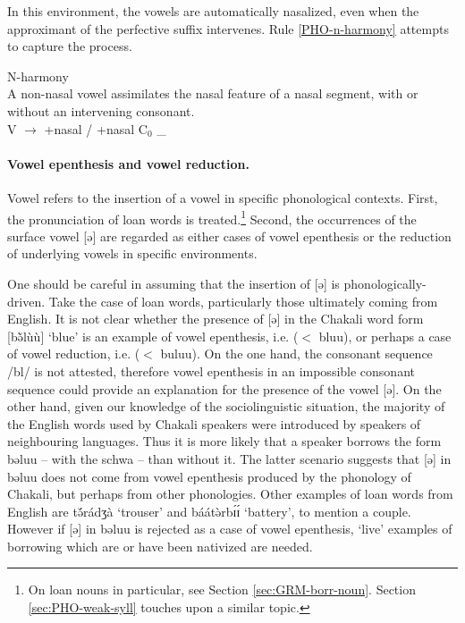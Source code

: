 In this environment, the vowels are  automatically nasalized, even when the
approximant of the perfective suffix intervenes. Rule \ref{PHO-n-harmony}
attempts to capture the process.

\begin{Rule}\label{PHO-n-harmony}{N-harmony}\\
A non-nasal vowel assimilates the nasal feature of a nasal segment, with or
without an intervening consonant. \\
 V $\rightarrow$  {\ob}{\sc +nasal}{\cb} /  {\ob}{\sc +nasal}{\cb} C$_0$  \_  
\end{Rule}




\paragraph{Vowel epenthesis and vowel reduction.}
\label{sec:epenthesis}


Vowel  refers to the insertion of a vowel in specific phonological contexts. First,  the pronunciation of loan words is treated.\footnote{On  loan nouns in particular, see Section \ref{sec:GRM-borr-noun}. Section \ref{sec:PHO-weak-syll} touches upon a similar topic.}  Second,  the occurrences of the surface vowel [{ə}] are regarded as  either cases of vowel epenthesis or the reduction of  underlying vowels in specific environments. 

One should be careful in assuming that the insertion of  [{ə}] is phonologically-driven.  Take the case of loan words, particularly those ultimately coming  from  English. It is not clear whether the presence of [{ə}] in the Chakali word form [{bə̆̀lùù}] `blue'  is an example of vowel epenthesis, i.e.  ($<$ {\sls bluu}),  or perhaps a case of vowel reduction, i.e.  ($<$ {\sls buluu}).  On the one hand, the  consonant sequence  /bl/ is not attested, therefore  vowel epenthesis in an impossible consonant sequence  could  provide an explanation for the presence of  the vowel [{ə}].  On the other hand, given our knowledge of the sociolinguistic situation,  the majority of the English words used by Chakali speakers   were introduced by speakers of neighbouring languages. Thus it is more likely that a speaker borrows the form {\sls bəluu} -- with the schwa --  than without it. The latter scenario suggests that  [{ə}] in {\sls bəluu} does not come from vowel epenthesis produced by the phonology of Chakali, but perhaps from other phonologies.  Other examples of loan words from English are {\sls tə̆́rádʒà} `trouser' and  {\sls báátə̀rbɪ́ɪ́} `battery', to mention a couple. However if   [{ə}]  in {\sls bəluu} is rejected as a case of vowel epenthesis, `live' examples of borrowing  which are or have been nativized are needed.  


